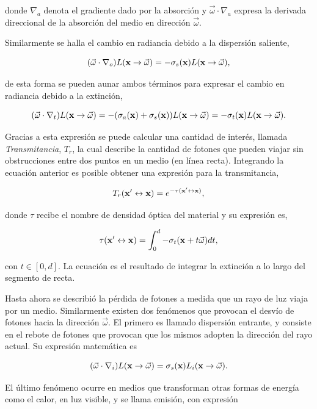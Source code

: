 donde $\nabla_{a}$ denota el gradiente dado por la absorción y $ \vec{\omega} \cdot \nabla_{a}$ expresa la derivada direccional de la absorción del medio en dirección $\vec{\omega}$.

Similarmente se halla el cambio en radiancia debido a la dispersión saliente,

$$ (\vec{\omega} \cdot \nabla_{o}) L(\bold{x} \rightarrow \vec{\omega}) = -\sigma_{s}(\bold{x}) L(\bold{x} \rightarrow \vec{\omega}),$$

de esta forma se pueden aunar ambos términos para expresar el cambio en radiancia debido a la extinción,

$$(\vec{\omega} \cdot \nabla_{t}) L(\bold{x} \rightarrow \vec{\omega}) = -(\sigma_{a}(\bold{x})+\sigma_{s}(\bold{x})) L(\bold{x} \rightarrow \vec{\omega}) = -\sigma_{t}(\bold{x}) L(\bold{x} \rightarrow \vec{\omega}).$$

Gracias a esta expresión se puede calcular una cantidad de interés, llamada {\em Transmitancia}, $T_{r}$, la cual describe la cantidad de fotones que pueden viajar sin obstrucciones entre dos puntos en un medio (en línea recta).
Integrando la ecuación anterior es posible obtener una expresión para la transmitancia,

$$T_{r}(\bold{x'} \leftrightarrow \bold{x}) = e^{-\tau(\bold{x'} \leftrightarrow \bold{x})},$$

donde $\tau$ recibe el nombre de densidad óptica del material y su expresión es,

$$\tau(\bold{x'} \leftrightarrow \bold{x}) = \int_{0}^{d} -\sigma_{t}(\bold{x}+t\vec{\omega})dt,$$

con $t \in [0,d]$.
La ecuación es el resultado de integrar la extinción a lo largo del segmento de recta.


Hasta ahora se describió la pérdida de fotones a medida que un rayo de luz viaja por un medio.
Similarmente existen dos fenómenos que provocan el desvío de fotones hacia la dirección $\vec{\omega}$.
El primero es llamado dispersión entrante, y consiste en el rebote de fotones que provocan que los mismos adopten la dirección del rayo actual.
Su expresión matemática es

$$ (\vec{\omega} \cdot \nabla_{i}) L(\bold{x} \rightarrow \vec{\omega}) = \sigma_{s}(\bold{x}) L_{i}(\bold{x} \rightarrow \vec{\omega}).$$

El último fenómeno ocurre en medios que transforman otras formas de energía como el calor, en luz visible, y se llama emisión, con expresión

